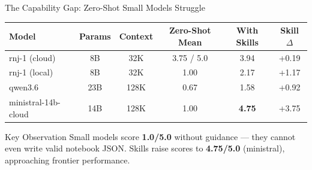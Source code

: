 \documentclass[aspectratio=169,10pt]{beamer}
\begin{document}
\begin{frame}{The Capability Gap: Zero-Shot Small Models Struggle}
  \centering
  \small
  \renewcommand{\arraystretch}{1.3}
  \begin{tabular}{l c c c c c}
    \toprule
    \textbf{Model} & \textbf{Params} & \textbf{Context} & \textbf{Zero-Shot Mean} & \textbf{With Skills} & \textbf{Skill $\Delta$} \\
    \midrule
    rnj-1 (cloud) & 8B & 32K & 3.75 / 5.0 & 3.94 & +0.19 \\
    rnj-1 (local) & 8B & 32K & 1.00 & 2.17 & +1.17 \\
    qwen3.6 & 23B & 128K & 0.67 & 1.58 & +0.92 \\
    \textcolor{okgreen}{ministral-14b-cloud} & 14B & 128K & 1.00 & \textbf{4.75} & +3.75 \\
    \bottomrule
  \end{tabular}
  
  \vspace{0.4cm}
  \begin{block}{Key Observation}
    Small models score \textbf{1.0/5.0} without guidance — they cannot even write valid notebook JSON.  
    Skills raise scores to \textbf{4.75/5.0} (ministral), approaching frontier performance.
  \end{block}
\end{frame}
\end{document}
